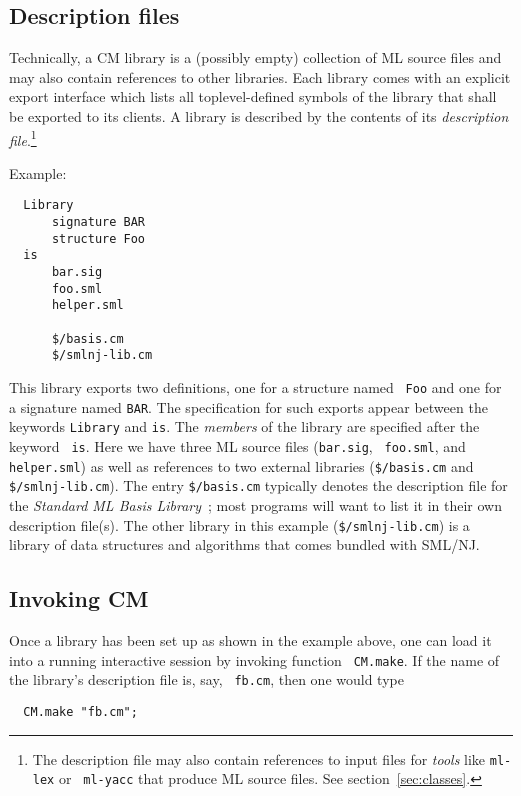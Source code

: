 \documentclass[titlepage,letterpaper]{article}
\begin{document}
\subsection{Description files}

Technically, a CM library is a (possibly empty) collection of ML
source files and may also contain references to other libraries.  Each
library comes with an explicit export interface which lists all
toplevel-defined symbols of the library that shall be exported to its
clients.  A library is described by the contents of its {\em
description file}.\footnote{The description file may also contain
references to input files for {\em tools} like {\tt ml-lex} or {\tt
ml-yacc} that produce ML source files.  See section~\ref{sec:classes}.}

\noindent Example:

\begin{verbatim}
  Library
      signature BAR
      structure Foo
  is
      bar.sig
      foo.sml
      helper.sml

      $/basis.cm
      $/smlnj-lib.cm
\end{verbatim}

This library exports two definitions, one for a structure named {\tt
Foo} and one for a signature named {\tt BAR}.  The specification for
such exports appear between the keywords {\tt Library} and {\tt is}.
The {\em members} of the library are specified after the keyword {\tt
is}.  Here we have three ML source files ({\tt bar.sig}, {\tt
foo.sml}, and {\tt helper.sml}) as well as references to two external
libraries ({\tt \$/basis.cm} and {\tt \$/smlnj-lib.cm}).  The entry
{\tt \$/basis.cm} typically denotes the description file for the {\it
Standard ML Basis Library}~\cite{reppy99:basis}; most programs will
want to list it in their own description file(s).  The other library
in this example ({\tt \$/smlnj-lib.cm}) is a library of data
structures and algorithms that comes bundled with SML/NJ.

\subsection{Invoking CM}

Once a library has been set up as shown in the example above, one can
load it into a running interactive session by invoking function {\tt
CM.make}.  If the name of the library's description file is, say, {\tt
fb.cm}, then one would type

\begin{verbatim}
  CM.make "fb.cm";
\end{verbatim}
\end{document}
